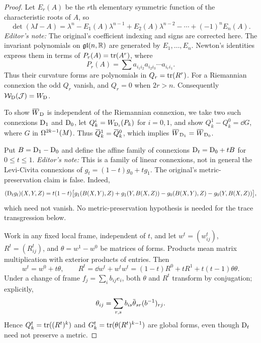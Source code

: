 \documentclass[../main]{subfiles}
\begin{document}
\begin{proof}
Let $E_r(A)$ be the $r$th elementary symmetric function of the characteristic roots of $A$, so
\[\det(\lambda I-A)=\lambda^n-E_1(A)\lambda^{n-1}+E_2(A)\lambda^{n-2}-\cdots+(-1)^nE_n(A).\]
\emph{Editor's note:} The original's coefficient indexing and signs are corrected here. The invariant polynomials on $\frakGL(n,\bR)$ are generated by $E_1,\dots,E_n$. Newton's identities express them in terms of $P_r(A)=\tr(A^r)$, where
\[P_r(A)=\sum a_{i_1i_2}a_{i_2i_3}\cdots a_{i_ri_1}.\]
Thus their curvature forms are polynomials in $Q_r=\tr(R^r)$. For a Riemannian connexion the odd $Q_r$ vanish, and $Q_r=0$ when $2r>n$. Consequently ${\cal W}_\connection({\cal J})=W_\connection$.

To show $\xoverline{W}_\connection$ is independent of the Riemannian connexion, we take two such connexions $\connection_1$ and $\connection_0$, let $Q_k^i=W_{\connection_i}(P_k)$ for $i=0,1$, and show $Q_k^1-Q_k^0=\dd G$, where $G$ in $\formbundle{M}{2k-1}$. Thus $\xoverline{Q}_k^1=\xoverline{Q}_k^0$, which implies $\xoverline{W}_{\connection_1}=\xoverline{W}_{\connection_0}$.

Put $B=\connection_1-\connection_0$ and define the affine family of connexions $\connection_t=\connection_0+tB$ for $0\leq t\leq1$. \emph{Editor's note:} This is a family of linear connexions, not in general the Levi-Civita connexions of $g_t=(1-t)g_0+tg_1$. The original's metric-preservation claim is false. Indeed,
\[(\connection_t g_t)(X,Y,Z)=t(1-t)\bigl[g_1(B(X,Y),Z)+g_1(Y,B(X,Z))-g_0(B(X,Y),Z)-g_0(Y,B(X,Z))\bigr],\]
which need not vanish. No metric-preservation hypothesis is needed for the trace transgression below.

Work in any fixed local frame, independent of $t$, and let $w^t=(w_{ij}^t)$, $R^t=(R_{ij}^t)$, and $\theta=w^1-w^0$ be matrices of forms. Products mean matrix multiplication with exterior products of entries. Then
\[w^t=w^0+t\theta,\qquad R^t=\dd w^t+w^tw^t=(1-t)R^0+tR^1+t(t-1)\theta\theta.\]
Under a change of frame $f_j=\sum_i b_{ij}e_i$, both $\theta$ and $R^t$ transform by conjugation; explicitly,
\[\theta_{ij}=\sum_{r,s}b_{is}\xoverline{\theta}_{sr}(b^{-1})_{rj}.\]
Hence $Q_k^t=\tr((R^t)^k)$ and $G_k^t=\tr(\theta(R^t)^{k-1})$ are global forms, even though $\connection_t$ need not preserve a metric.


\end{proof}
\end{document}
